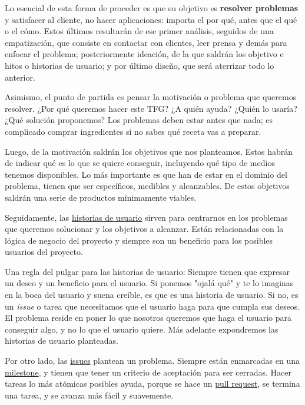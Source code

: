 Lo esencial de esta forma de proceder es que su objetivo es \textbf{resolver problemas} y satisfacer 
al cliente, no hacer aplicaciones: importa el por qué, antes que el qué o el cómo. Estos 
últimos resultarán de ese primer análisis, seguidos de una empatización, que consiste 
en contactar con clientes, leer prensa y demás para enfocar el problema; posteriormente 
ideación, de la que saldrán los objetivo e hitos o historias de usuario; y por último diseño, 
que será aterrizar todo lo anterior. 

Asimismo, el punto de partida es pensar la motivación o problema que queremos resolver. 
¿Por qué queremos hacer este TFG? ¿A quién ayuda? ¿Quién lo usaría? ¿Qué solución proponemos? 
Los problemas deben estar antes que nada; es complicado comprar ingredientes si no sabes qué 
receta vas a preparar. 

Luego, de la motivación saldrán los objetivos que nos planteamos. Estos habrán de indicar 
qué es lo que se quiere conseguir, incluyendo qué tipo de medios tenemos disponibles. Lo 
más importante es que han de estar en el dominio del problema, tienen que ser específicos, 
medibles y alcanzables\cite{objetivos}. De estos objetivos saldrán una serie de productos 
mínimamente viables. 

Seguidamente, las \href{https://jj.github.io/curso-tdd/temas/dise%C3%B1o.html}{historias de usuario} sirven 
para centrarnos en los problemas que queremos solucionar 
y los objetivos a alcanzar. Están relacionadas con la lógica de 
negocio del proyecto y siempre son un beneficio para los posibles usuarios del proyecto.

Una regla del pulgar para las historias de usuario: Siempre tienen que expresar un deseo y un 
beneficio para el usuario. Si ponemos "ojalá qué" y te lo imaginas en la boca del usuario y suena 
creíble, es que es una historia de usuario. Si no, es un \textit{issue} o tarea que necesitamos
que el usuario haga para que cumpla sus deseos. El problema reside en poner lo que nosotros queremos que 
haga el usuario para conseguir algo, y no lo que el usuario quiere. Más adelante expondremos las historias 
de usuario planteadas.

Por otro lado, las \href{https://docs.github.com/articles/about-issues}{issues} plantean un problema. 
Siempre están enmarcadas en una \href{https://docs.github.com/en/issues/using-labels-and-milestones-to-track-work/about-milestones}{milestone}, 
y tienen que tener un criterio de aceptación para ser cerradas. Hacer tareas lo más atómicas posibles ayuda, porque 
se hace un \href{https://docs.github.com/en/pull-requests/collaborating-with-pull-requests/proposing-changes-to-your-work-with-pull-requests/about-pull-requests}{pull request}, 
se termina una tarea, y se avanza más fácil y suavemente.

